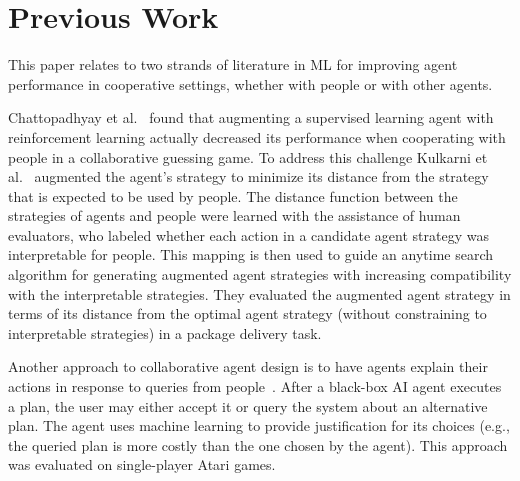 \documentclass[letterpaper]{article} %
\begin{document}
 \section{Previous Work}


This paper relates to two strands of literature in ML for improving agent performance in cooperative settings, whether with people or with other agents.

Chattopadhyay et al.~ found that augmenting a supervised learning agent with 
reinforcement learning actually decreased its performance when cooperating with people in a  collaborative guessing game. To address this challenge Kulkarni et al.~ augmented the agent's strategy to minimize its distance from the  strategy that is expected to be used by people.
The distance function between the strategies of agents and people  were learned with the assistance of human evaluators, who labeled whether  each action in 
a candidate agent strategy was interpretable for people.  This mapping is then used to guide an anytime search algorithm for  generating augmented agent strategies with increasing 
compatibility with the interpretable strategies.
They evaluated the augmented agent strategy in terms of its distance from the optimal agent strategy (without constraining to interpretable strategies) in a package delivery task. 

Another approach to collaborative agent design is to have agents explain their actions in response to queries from people~\cite{sreedharan2020bridging}. After a black-box AI agent executes a plan, the user may either accept it or query the system about an alternative plan. The agent uses machine learning  to provide justification for its choices  (e.g., the queried plan is more costly  than the one chosen by the agent). This approach was evaluated on  single-player Atari games.
\end{document}
